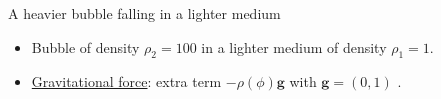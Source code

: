 \begin{frame}{A heavier bubble falling in a lighter medium}
  \small
  \begin{itemize}
    \item Bubble of density $\rho_2=100$ in a lighter medium of density $\rho_1=1$.
    \item  \underline{Gravitational force}: extra term \alert{$-\rho(\phi)\boldsymbol{g}$} with $\boldsymbol{g}=(0,1)$ .%
  \end{itemize}
  



  \begin{figure}[htbp]
    \centering

    \if{}
    \fi
  \end{figure}
\end{frame}


